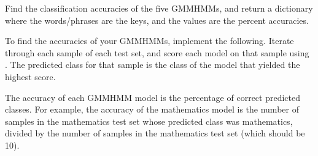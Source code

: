 \begin{problem}
Find the classification accuracies of the five GMMHMMs, and return a dictionary where the words/phrases are the keys, and the values are the percent accuracies. 
    
To find the accuracies of your GMMHMMs, implement the following.
Iterate through each sample of each test set, and score each model on that sample using .
The predicted class for that sample is the class of the model that yielded the highest score.

The accuracy of each GMMHMM model is the percentage of correct predicted classes.
For example, the accuracy of the mathematics model is the number of samples in the mathematics test set whose predicted class was mathematics, divided by the number of samples in the mathematics test set (which should be 10).

\end{problem}
























